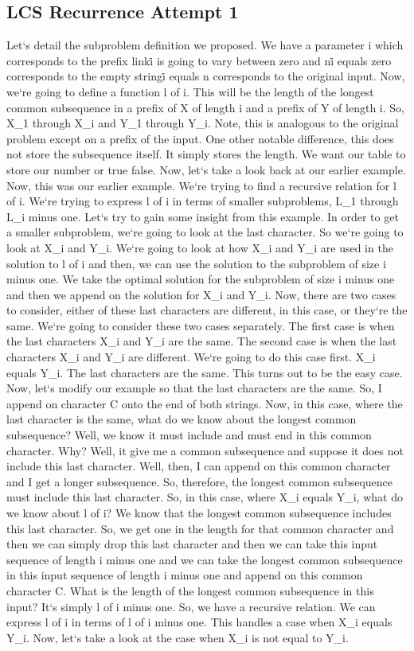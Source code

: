 \subsection{LCS  Recurrence Attempt 1}
Let`s detail the subproblem definition we proposed.
We have a parameter i which corresponds to the prefix link\. i is going to vary between zero and n\. i equals zero corresponds to the empty string\. i equals n corresponds to the original input.
Now, we`re going to define a function l of i.
This will be the length of the longest common subsequence in a prefix of X of length i and a prefix of Y of length i.
So, X\_1 through X\_i and Y\_1 through Y\_i.
Note, this is analogous to the original problem except on a prefix of the input.
One other notable difference, this does not store the subsequence itself.
It simply stores the length.
We want our table to store our number or true false.
Now, let`s take a look back at our earlier example.
Now, this was our earlier example.
We`re trying to find a recursive relation for l of i.
We`re trying to express l of i in terms of smaller subproblems, L\_1 through L\_i minus one.
Let`s try to gain some insight from this example.
In order to get a smaller subproblem, we`re going to look at the last character.
So we`re going to look at X\_i and Y\_i.
We`re going to look at how X\_i and Y\_i are used in the solution to l of i and then, we can use the solution to the subproblem of size i minus one.
We take the optimal solution for the subproblem of size i minus one and then we append on the solution for X\_i and Y\_i.
Now, there are two cases to consider, either of these last characters are different, in this case, or they`re the same.
We`re going to consider these two cases separately.
The first case is when the last characters X\_i and Y\_i are the same.
The second case is when the last characters X\_i and Y\_i are different.
We`re going to do this case first.
X\_i equals Y\_i.
The last characters are the same.
This turns out to be the easy case.
Now, let`s modify our example so that the last characters are the same.
So, I append on character C onto the end of both strings.
Now, in this case, where the last character is the same, what do we know about the longest common subsequence? Well, we know it must include and must end in this common character.
Why? Well, it give me a common subsequence and suppose it does not include this last character.
Well, then, I can append on this common character and I get a longer subsequence.
So, therefore, the longest common subsequence must include this last character.
So, in this case, where X\_i equals Y\_i, what do we know about l of i? We know that the longest common subsequence includes this last character.
So, we get one in the length for that common character and then we can simply drop this last character and then we can take this input sequence of length i minus one and we can take the longest common subsequence in this input sequence of length i minus one and append on this common character C\@.
What is the length of the longest common subsequence in this input? It`s simply l of i minus one.
So, we have a recursive relation.
We can express l of i in terms of l of i minus one.
This handles a case when X\_i equals Y\_i.
Now, let`s take a look at the case when X\_i is not equal to Y\_i.


